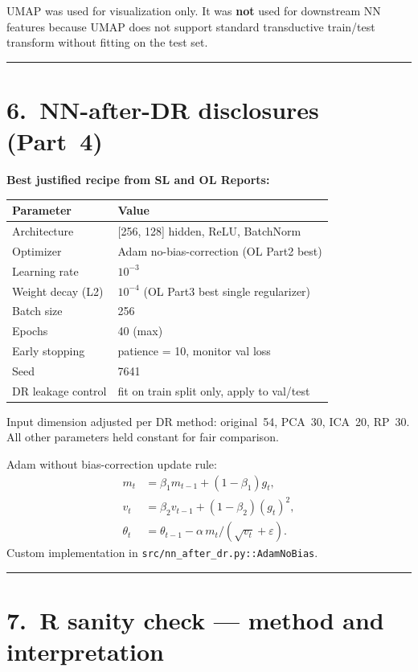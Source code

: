 \documentclass[11pt]{article}
\begin{document}
UMAP was used for visualization only.
It was \textbf{not} used for downstream NN features because UMAP does not
support standard transductive train/test transform without fitting on
the test set.

{\color{denimmid}\rule{\linewidth}{0.4pt}}

\section*{6.\ NN-after-DR disclosures (Part~4)}

\textbf{Best justified recipe from SL and OL Reports:}

\begin{center}
\begin{tabular}{ll}
\toprule
\textbf{Parameter} & \textbf{Value} \\
\midrule
Architecture      & [256, 128] hidden, ReLU, BatchNorm \\
Optimizer         & Adam no-bias-correction (OL Part2 best) \\
Learning rate     & $10^{-3}$ \\
Weight decay (L2) & $10^{-4}$ (OL Part3 best single regularizer) \\
Batch size        & 256 \\
Epochs            & 40 (max) \\
Early stopping    & patience = 10, monitor val loss \\
Seed              & 7641 \\
DR leakage control & fit on train split only, apply to val/test \\
\bottomrule
\end{tabular}
\end{center}

Input dimension adjusted per DR method:
original~54, PCA~30, ICA~20, RP~30.
All other parameters held constant for fair comparison.

Adam without bias-correction update rule:
\begin{align*}
m_t &= \beta_1 m_{t-1} + (1-\beta_1)g_t, \\
v_t &= \beta_2 v_{t-1} + (1-\beta_2)(g_t)^{2}, \\
\theta_t &= \theta_{t-1} - \alpha\, m_t / (\sqrt{v_t}+\varepsilon).
\end{align*}
Custom implementation in \texttt{src/nn\_after\_dr.py::AdamNoBias}.

{\color{denimmid}\rule{\linewidth}{0.4pt}}

\section*{7.\ R sanity check --- method and interpretation}
\end{document}
